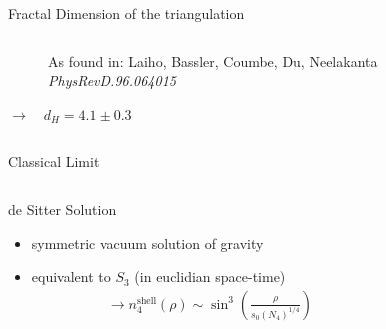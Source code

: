 \begin{frame}{Fractal Dimension of the triangulation}
\begin{columns}
\begin{column}{0.4\textwidth}
{\begin{figure}
    \caption{\tiny{As found in: Laiho, Bassler, Coumbe, Du, Neelakanta \emph{PhysRevD.96.064015}}}
   \end{figure}
   $\longrightarrow \quad d_H = 4.1 \pm 0.3$}
  \end{column}
 \end{columns}
\end{frame}

\begin{frame}{Classical Limit}
 \begin{columns}
  \begin{column}{0.48\textwidth}
   \begin{block}{de Sitter Solution}
    \vspace{0pt}
    \begin{itemize}
     \item symmetric vacuum solution of gravity
     \item equivalent to $S_3$ (in euclidian space-time)
           \begin{align*}
            \rightarrow n_4^{\textrm{shell}} (\rho) \sim \sin^3 \left(  \frac{\rho}{s_0(N_4)^{1/4}} \right)
           \end{align*}
    \end{itemize}
   \end{block}
  \end{column}
  \begin{column}{0.48\textwidth}
\end{column}
\end{columns}
\end{frame}
